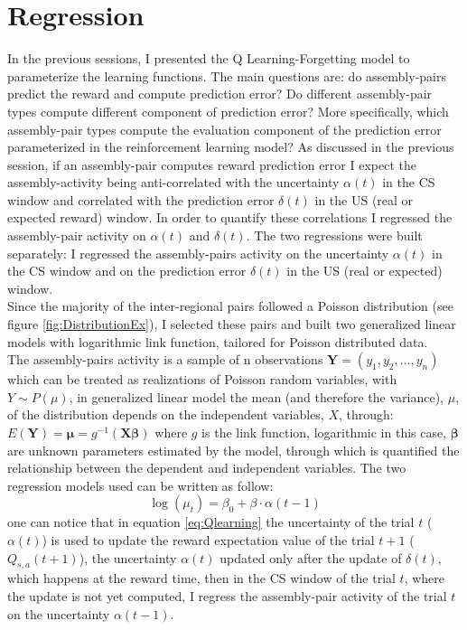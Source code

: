 \section{Regression}
\label{sec:Regression}
In the previous sessions, I presented the Q Learning-Forgetting model to parameterize the learning functions. The main questions are: do assembly-pairs predict the reward and compute prediction error? Do different assembly-pair types compute different component of prediction error? More specifically, which assembly-pair types compute the evaluation component of the prediction error parameterized in the reinforcement learning model? As discussed in the previous session, if an assembly-pair computes reward prediction error I expect the assembly-activity being anti-correlated with the uncertainty $\alpha(t)$ in the CS window and correlated with the prediction error $\delta(t)$ in the US (real or expected reward) window. In order to quantify these correlations I regressed the assembly-pair activity on $\alpha (t)$ and $\delta (t)$. The two regressions were built separately: I regressed the assembly-pairs activity on the uncertainty $\alpha(t)$ in the CS window and on the prediction error $\delta(t)$ in the US (real or expected) window.\\Since the majority of the inter-regional pairs followed a Poisson distribution (see figure \ref{fig:DistributionEx}), I selected these pairs and built two generalized linear models with logarithmic link function, tailored for Poisson distributed data.\\The assembly-pairs activity is a sample of n observations $\mathbf{Y}=(y_1, y_2,..., y_n)$ which can be treated as realizations of Poisson random variables, with $Y\sim P(\mu)$, in generalized linear model the mean (and therefore the variance), $\mu$, of the distribution depends on the independent variables, $X$, through:
$E (\mathbf {Y} )={\boldsymbol {\mu }}=g^{-1}(\mathbf {X} {\boldsymbol {\beta }})$ where $g$ is the link function, logarithmic in this case, $\boldsymbol{\beta}$ are unknown parameters estimated by the model, through which is quantified the relationship between the dependent and independent variables. The two regression models used can be written as follow:
\begin{equation}
    \log(\mu_t)=\beta_0+\beta\cdot\alpha(t-1)
    \label{eq:regrAlpha}
\end{equation}
one can notice that in equation \ref{eq:Qlearning} the uncertainty of the trial $t$ ($\alpha(t)$) is used to update the reward expectation value of the trial $t+1$ ($Q_{s,a}(t+1)$), the uncertainty $\alpha(t)$ updated only after the update of $\delta(t)$, which happens at the reward time, then in the CS window of the trial $t$, where the update is not yet computed, I regress the assembly-pair activity of the trial $t$ on the uncertainty $\alpha(t-1)$.
